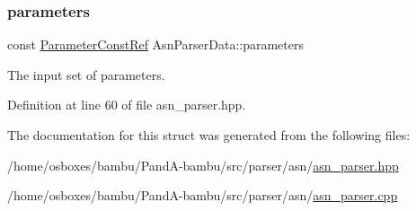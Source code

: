 \subsubsection{\texorpdfstring{parameters}{parameters}}
{\footnotesize\ttfamily const \hyperlink{Parameter_8hpp_a37841774a6fcb479b597fdf8955eb4ea}{Parameter\+Const\+Ref} Asn\+Parser\+Data\+::parameters}



The input set of parameters. 



Definition at line 60 of file asn\+\_\+parser.\+hpp.



The documentation for this struct was generated from the following files\+:\begin{DoxyCompactItemize}
\item 
/home/osboxes/bambu/\+Pand\+A-\/bambu/src/parser/asn/\hyperlink{asn__parser_8hpp}{asn\+\_\+parser.\+hpp}\item 
/home/osboxes/bambu/\+Pand\+A-\/bambu/src/parser/asn/\hyperlink{asn__parser_8cpp}{asn\+\_\+parser.\+cpp}\end{DoxyCompactItemize}
